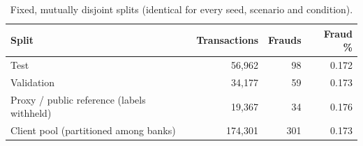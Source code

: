 \begin{table}[t]
\centering
\small
\caption{Fixed, mutually disjoint splits (identical for every seed, scenario and condition).}
\label{tab:splits}
\begin{tabular}{lrrr}
\toprule
Split & Transactions & Frauds & Fraud \% \\
\midrule
Test & 56{,}962 & 98 & 0.172 \\
Validation & 34{,}177 & 59 & 0.173 \\
Proxy / public reference (labels withheld) & 19{,}367 & 34 & 0.176 \\
Client pool (partitioned among banks) & 174{,}301 & 301 & 0.173 \\
\bottomrule
\end{tabular}
\end{table}
